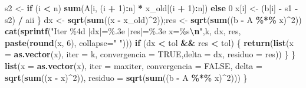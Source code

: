 \documentclass[
]{book}
\newenvironment{Shaded}{\begin{snugshade}}{\end{snugshade}}
\newcommand{\AttributeTok}[1]{\textcolor[rgb]{0.13,0.29,0.53}{#1}}
\newcommand{\ConstantTok}[1]{\textcolor[rgb]{0.56,0.35,0.01}{#1}}
\newcommand{\ControlFlowTok}[1]{\textcolor[rgb]{0.13,0.29,0.53}{\textbf{#1}}}
\newcommand{\DecValTok}[1]{\textcolor[rgb]{0.00,0.00,0.81}{#1}}
\newcommand{\FunctionTok}[1]{\textcolor[rgb]{0.13,0.29,0.53}{\textbf{#1}}}
\newcommand{\NormalTok}[1]{#1}
\newcommand{\OtherTok}[1]{\textcolor[rgb]{0.56,0.35,0.01}{#1}}
\newcommand{\SpecialCharTok}[1]{\textcolor[rgb]{0.81,0.36,0.00}{\textbf{#1}}}
\newcommand{\StringTok}[1]{\textcolor[rgb]{0.31,0.60,0.02}{#1}}
\begin{document}
\begin{Shaded}
\begin{Highlighting}[]
\NormalTok{      s2 }\OtherTok{\textless{}{-}} \ControlFlowTok{if}\NormalTok{ (i }\SpecialCharTok{\textless{}}\NormalTok{ n) }\FunctionTok{sum}\NormalTok{(A[i, (i }\SpecialCharTok{+} \DecValTok{1}\NormalTok{)}\SpecialCharTok{:}\NormalTok{n] }\SpecialCharTok{*}\NormalTok{ x\_old[(i }\SpecialCharTok{+} \DecValTok{1}\NormalTok{)}\SpecialCharTok{:}\NormalTok{n]) }\ControlFlowTok{else} \DecValTok{0}
\NormalTok{      x[i] }\OtherTok{\textless{}{-}}\NormalTok{ (b[i] }\SpecialCharTok{{-}}\NormalTok{ s1 }\SpecialCharTok{{-}}\NormalTok{ s2) }\SpecialCharTok{/}\NormalTok{ aii}
\NormalTok{    \}}
\NormalTok{    dx  }\OtherTok{\textless{}{-}} \FunctionTok{sqrt}\NormalTok{(}\FunctionTok{sum}\NormalTok{((x }\SpecialCharTok{{-}}\NormalTok{ x\_old)}\SpecialCharTok{\^{}}\DecValTok{2}\NormalTok{));res }\OtherTok{\textless{}{-}} \FunctionTok{sqrt}\NormalTok{(}\FunctionTok{sum}\NormalTok{((b }\SpecialCharTok{{-}}\NormalTok{ A }\SpecialCharTok{\%*\%}\NormalTok{ x)}\SpecialCharTok{\^{}}\DecValTok{2}\NormalTok{))}
    \FunctionTok{cat}\NormalTok{(}\FunctionTok{sprintf}\NormalTok{(}\StringTok{"Iter \%4d |dx|=\%.3e  |res|=\%.3e   x=\%s}\SpecialCharTok{\textbackslash{}n}\StringTok{"}\NormalTok{,k, dx, res, }\FunctionTok{paste}\NormalTok{(}\FunctionTok{round}\NormalTok{(x, }\DecValTok{6}\NormalTok{), }\AttributeTok{collapse=}\StringTok{" "}\NormalTok{)))}
    \ControlFlowTok{if}\NormalTok{ (dx }\SpecialCharTok{\textless{}}\NormalTok{ tol }\SpecialCharTok{\&\&}\NormalTok{ res }\SpecialCharTok{\textless{}}\NormalTok{ tol) \{}
      \FunctionTok{return}\NormalTok{(}\FunctionTok{list}\NormalTok{(}\AttributeTok{x =} \FunctionTok{as.vector}\NormalTok{(x), }\AttributeTok{iter =}\NormalTok{ k, }\AttributeTok{convergencia =} \ConstantTok{TRUE}\NormalTok{,}\AttributeTok{delta =}\NormalTok{ dx, }\AttributeTok{residuo =}\NormalTok{ res))}
\NormalTok{    \}}
\NormalTok{  \}}
  \FunctionTok{list}\NormalTok{(}\AttributeTok{x =} \FunctionTok{as.vector}\NormalTok{(x), }\AttributeTok{iter =}\NormalTok{ maxiter, }\AttributeTok{convergencia =} \ConstantTok{FALSE}\NormalTok{,}
       \AttributeTok{delta =} \FunctionTok{sqrt}\NormalTok{(}\FunctionTok{sum}\NormalTok{((x }\SpecialCharTok{{-}}\NormalTok{ x)}\SpecialCharTok{\^{}}\DecValTok{2}\NormalTok{)), }\AttributeTok{residuo =} \FunctionTok{sqrt}\NormalTok{(}\FunctionTok{sum}\NormalTok{((b }\SpecialCharTok{{-}}\NormalTok{ A }\SpecialCharTok{\%*\%}\NormalTok{ x)}\SpecialCharTok{\^{}}\DecValTok{2}\NormalTok{)))}
\NormalTok{\}}
\end{Highlighting}
\end{Shaded}
\end{document}

